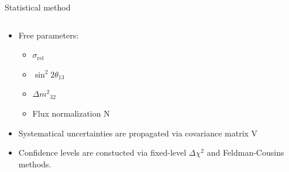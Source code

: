 \documentclass[usenames, dvipsnames]{beamer}
\newcommand{\Dm}{\ensuremath{\Delta m^2}}
\newcommand{\Important}{\textcolor{BrickRed}}
\newcommand{\impitem}{\item[\Important{$\bullet$}]}
\newcommand{\srel}{\ensuremath{\sigma_{\text{rel}}}}
\begin{document}
\begin{frame}[fragile]
\begin{columns}[T]
\begin{column}{.47\textwidth}
\begin{block}{Statistical method}
\begin{columns}[T]
\begin{column}{0.47\textwidth}
            \vspace*{-1.85cm}
            {\hspace*{-1cm}
            \begin{itemize}
                \item Free parameters:
                    \begin{itemize}
                    \impitem \Important{\srel}
                    \impitem \Important{\ensuremath{\sin^2 2\theta_{13}}}
                    \impitem \Important{\ensuremath{\Dm_{32}}}
                    \impitem Flux normalization \Important{N}
                    \end{itemize}
                \item Systematical uncertainties are propagated via covariance
                    matrix \Important{V}
                    \impitem Confidence levels are constucted via \Important{fixed-level
                        \ensuremath{\Delta \chi^2}} and 
                        \Important{Feldman-Cousins} methods.
            \end{itemize}
        }
        \end{column}
    \end{columns}
\end{block}


\end{column}
\end{columns}
\end{frame}
\end{document}
